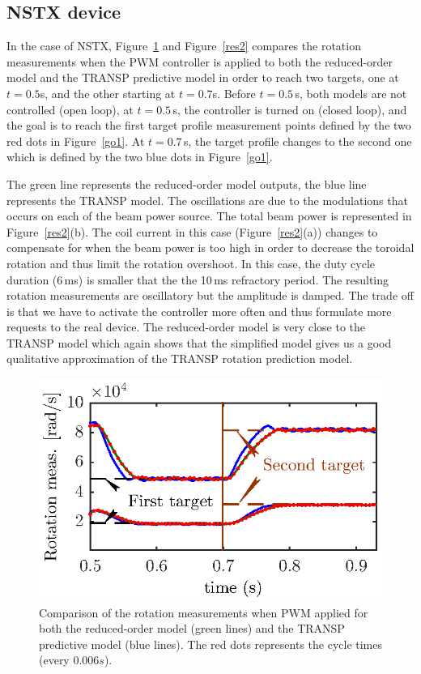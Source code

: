 \documentclass[12pt,lot, lof]{puthesis}
\begin{document}
\subsection{NSTX device}

In the case of NSTX, Figure~\ref{res1} and Figure~\ref{res2} compares the rotation measurements when the PWM controller is applied to both the reduced-order model and the TRANSP predictive model in order to reach two targets, one at $t = 0.5$s, and the other starting at $t=0.7$s.
Before $t=0.5$\,s, both models are not controlled (open loop), at $t = 0.5$\,s, the controller is turned on (closed loop), and the goal is to reach the first target profile measurement points defined by the two red dots in Figure~\ref{go1}. At $t = 0.7$\,s, the  target profile changes to the second one which is defined by the two blue dots in Figure~\ref{go1}.

The green line represents the reduced-order model outputs, the blue line represents the TRANSP model. The oscillations are due to the modulations that occurs on each of the beam power source. The total beam power is represented in Figure~\ref{res2}(b). The coil current in this case (Figure~\ref{res2}(a)) changes to compensate for when the beam power is too high in order to decrease the toroidal rotation and thus limit the rotation overshoot.
In this case, the duty cycle duration (6\,ms) is smaller that the the 10\,ms refractory period.
The resulting rotation measurements are oscillatory but the amplitude is damped. The trade off is that we have to activate the controller more often and thus formulate more requests to the real device.
The reduced-order model is very close to the TRANSP model which again shows that the simplified model gives us a good qualitative approximation of the TRANSP rotation prediction model.

\begin{figure}[htbp]
	\centering
	\includegraphics[width= 0.7\linewidth]{fig18}
	\caption{Comparison of the rotation measurements when PWM applied for both the reduced-order model (green lines) and the TRANSP predictive model (blue lines). The red dots represents the cycle times (every $0.006 s$).}
	\label{res1}
\end{figure}
\end{document}
